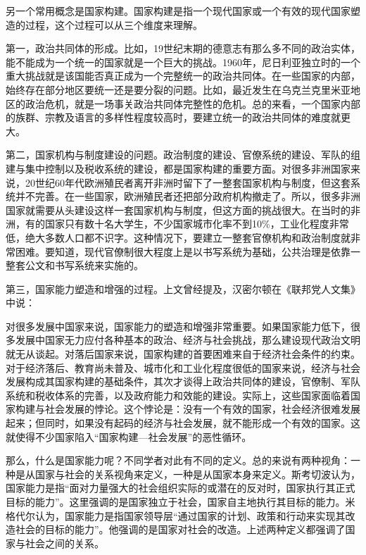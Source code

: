 另一个常用概念是国家构建。国家构建是指一个现代国家或一个有效的现代国家塑造的过程，这个过程可以从三个维度来理解。

第一，政治共同体的形成。比如，19世纪末期的德意志有那么多不同的政治实体，能不能成为一个统一的国家就是一个巨大的挑战。1960年，尼日利亚独立时的一个重大挑战就是该国能否真正成为一个完整统一的政治共同体。在一些国家的内部，始终存在部分地区要统一还是要分裂的问题。比如，最近发生在乌克兰克里米亚地区的政治危机，就是一场事关政治共同体完整性的危机。总的来看，一个国家内部的族群、宗教及语言的多样性程度较高时，要建立统一的政治共同体的难度就更大。

第二，国家机构与制度建设的问题。政治制度的建设、官僚系统的建设、军队的组建与集中控制以及税收系统的建设，都是国家构建的重要方面。对很多非洲国家来说，20世纪60年代欧洲殖民者离开非洲时留下了一整套国家机构与制度，但这套系统并不完善。在一些国家，欧洲殖民者还把部分政府机构撤走了。所以，很多非洲国家就需要从头建设这样一套国家机构与制度，但这方面的挑战很大。在当时的非洲，有的国家只有数十名大学生，不少国家城市化率不到10\%，工业化程度非常低，绝大多数人口都不识字。这种情况下，要建立一整套官僚机构和政治制度就非常困难。要知道，现代官僚制很大程度上是以书写系统为基础，公共治理是依靠一整套公文和书写系统来实施的。

第三，国家能力塑造和增强的过程。上文曾经提及，汉密尔顿在《联邦党人文集》中说：


对很多发展中国家来说，国家能力的塑造和增强非常重要。如果国家能力低下，很多发展中国家无力应付各种基本的政治、经济与社会挑战，那么建设现代政治文明就无从谈起。对落后国家来说，国家构建的首要困难来自于经济社会条件的约束。对于经济落后、教育尚未普及、城市化和工业化程度很低的国家来说，经济与社会发展构成其国家构建的基础条件，其次才谈得上政治共同体的建设，官僚制、军队系统和税收体系的完善，以及政府能力和效能的建设。实际上，这些国家面临着国家构建与社会发展的悖论。这个悖论是：没有一个有效的国家，社会经济很难发展起来；但同时，如果没有起码的经济与社会发展，就不能形成一个有效的国家。这就使得不少国家陷入“国家构建—社会发展”的恶性循环。

那么，什么是国家能力呢？不同学者对此有不同的定义。总的来说有两种视角：一种是从国家与社会的关系视角来定义，一种是从国家本身来定义。斯考切波认为，国家能力是指“面对力量强大的社会组织实际的或潜在的反对时，国家执行其正式目标的能力”。这里强调的是国家独立于社会，国家自主地执行其目标的能力。米格代尔认为，国家能力是指国家领导层“通过国家的计划、政策和行动来实现其改造社会的目标的能力”。他强调的是国家对社会的改造。上述两种定义都强调了国家与社会之间的关系。


